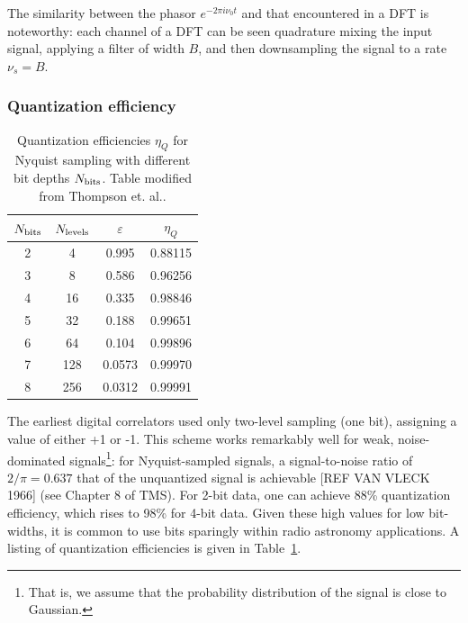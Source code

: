 \documentclass{ws-rv961x669}
\begin{document}
The similarity between the phasor $e^{-2\pi i \nu_0 t}$ and that encountered in a DFT is noteworthy: each channel of a DFT can be seen quadrature mixing the input signal, applying a filter of width $B$, and then downsampling the signal to a rate $\nu_s=B$.


\subsubsection{Quantization efficiency \label{sub:quant}}

\begin{table}
	\caption{Quantization efficiencies $\eta_Q$ for Nyquist sampling with different bit depths $N_{\rm{bits}}$. Table modified from Thompson et. al.\citep{Thompson:2007p8886}.\label{tab:quant_eff}}
	\begin{center}
	\begin{tabular}{c c c c}
	\hline
	$N_{\rm{bits}}$ & $N_{\rm{levels}}$ & $\varepsilon$ & $\eta_Q$ \\
	\hline
	\hline
	2 & 4   & 0.995  & 0.88115 \\
	3 & 8   & 0.586  & 0.96256 \\
	4 & 16  & 0.335  & 0.98846 \\
	5 & 32  & 0.188  & 0.99651 \\
	6 & 64  & 0.104  & 0.99896 \\
	7 & 128 & 0.0573 & 0.99970 \\
	8 & 256 & 0.0312 & 0.99991 \\
	\hline
	\end{tabular}
	\end{center}
\end{table}

The earliest digital correlators \citep{Weinreb:1963p10042} used only two-level sampling (one bit), assigning a value of either +1 or -1. This scheme works remarkably well for weak, noise-dominated signals\footnote{That is, we assume that the probability distribution of the signal is close to Gaussian.}: for Nyquist-sampled signals, a signal-to-noise ratio of $2/\pi=0.637$ that of the unquantized signal is achievable [REF VAN VLECK 1966] (see Chapter 8 of TMS\citet{ThompsonMoranSwenson2004}). For 2-bit data, one can achieve 88\% quantization efficiency, which rises to 98\% for 4-bit data. Given these high values for low bit-widths, it is common to use bits sparingly within radio astronomy applications. A listing of quantization efficiencies\cite{Thompson:2007p8886} is given in Table~\ref{tab:quant_eff}.
\end{document}
